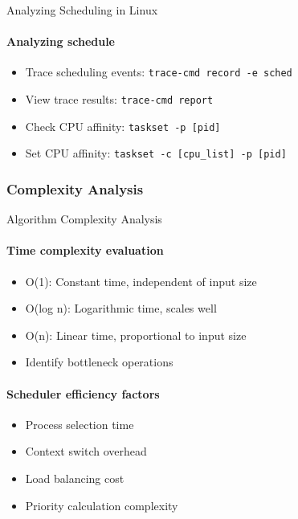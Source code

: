 \begin{KR}{Analyzing Scheduling in Linux}
    \paragraph{Analyzing schedule}
    \begin{itemize}
        \item Trace scheduling events: \texttt{trace-cmd record -e sched}
        \item View trace results: \texttt{trace-cmd report}
        \item Check CPU affinity: \texttt{taskset -p [pid]}
        \item Set CPU affinity: \texttt{taskset -c [cpu\_list] -p [pid]}
    \end{itemize}
\end{KR}




\subsubsection{Complexity Analysis}


\begin{KR}{Algorithm Complexity Analysis}
    \paragraph{Time complexity evaluation}
    \begin{itemize}
        \item O(1): Constant time, independent of input size
        \item O(log n): Logarithmic time, scales well
        \item O(n): Linear time, proportional to input size
        \item Identify bottleneck operations
    \end{itemize}
    
    \paragraph{Scheduler efficiency factors}
    \begin{itemize}
        \item Process selection time
        \item Context switch overhead
        \item Load balancing cost
        \item Priority calculation complexity
    \end{itemize}
\end{KR}

